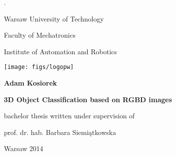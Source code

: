\pagestyle{empty}
\color{white} . \color{black}
\vspace{0.2cm}

\begin{center}
\begin{Huge}Warsaw University of Technology
\end{Huge}
\end{center}

\begin{center}
\begin{LARGE}Faculty of Mechatronics

\vspace{0.5cm}
Institute of Automation and Robotics
\vspace{1.0cm}
\end{LARGE}
\end{center}
\begin{center}\texttt{[image: figs/logopw]}\end{center} 

\vspace{0.5cm}

\begin{center}
\begin{LARGE}\textbf{Adam Kosiorek}\end{LARGE}
\end{center}

\vspace{0.5cm}

\begin{center}
\begin{Huge}\textbf{3D Object Classification based on RGBD images}
\vspace{0.5cm}
\end{Huge}
\end{center}

\vspace{0.5cm}

\begin{center}
\begin{Large}bachelor thesis written under supervision of\end{Large}

\vspace{0.2cm}

\begin{Large}prof. dr. hab. Barbara Siemiątkowska\end{Large}
\end{center}

\vspace{1.8cm}

\begin{center}
\begin{Large}Warsaw 2014\end{Large}
\end{center}